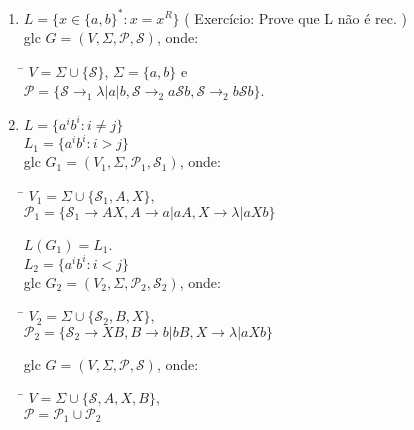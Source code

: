 \documentclass{article}
\begin{document}
\begin{enumerate}
    \item $ L = \{ x \in \{a,b\}^* : x = x^R \} $ ( Exercício: Prove que L não é rec. )\\
        glc $  G = ( V, \Sigma, \mathcal{P}, \mathcal{S} ) $, onde:
        \begin{tabbing}
            \hspace{0.5cm}\= $ V = \Sigma \cup \{\mathcal{S}\} $, $ \Sigma = \{a,b\} $ e\\
                        \> $ \mathcal{P} = \{   \mathcal{S} \rightarrow_1 \lambda | a | b, 
                                                \mathcal{S} \rightarrow_2 a\mathcal{S}b,
                                                \mathcal{S} \rightarrow_2 b\mathcal{S}b \} $.\\
        \end{tabbing}
    \item $ L = \{a^ib^i : i \neq j \} $\\
            $ L_1 = \{a^ib^i : i > j \} $\\
            glc $ G_1 = ( V_1, \Sigma, \mathcal{P}_1, \mathcal{S}_1 ) $, onde:
            \begin{tabbing}
                \hspace{0.5cm}\= $ V_1 = \Sigma \cup \{\mathcal{S}_1,A,X\}, $\\
                            \> $ \mathcal{P}_1 = \{ \mathcal{S}_1 \rightarrow AX,
                                                    A \rightarrow a | aA,
                                                    X \rightarrow \lambda | aXb \} $ \\ 
            \end{tabbing}
            $ L(G_1) = L_1 $.\\[5pt]
            $ L_2 = \{a^ib^i : i < j \} $\\
            glc $ G_2 = ( V_2, \Sigma, \mathcal{P}_2, \mathcal{S}_2 ) $, onde:
            \begin{tabbing}
                \hspace{0.5cm}\= $ V_2 = \Sigma \cup \{\mathcal{S}_2,B,X\}, $\\
                            \> $ \mathcal{P}_2 = \{ \mathcal{S}_2 \rightarrow XB,
                                                    B \rightarrow b | bB,
                                                    X \rightarrow \lambda | aXb \} $ \\ 
            \end{tabbing}
            glc $ G = ( V, \Sigma, \mathcal{P}, \mathcal{S} ) $, onde:
            \begin{tabbing}
                \hspace{0.5cm}\= $ V = \Sigma \cup \{\mathcal{S},A,X,B\}, $\\
                            \> $ \mathcal{P} = \mathcal{P}_1 \cup \mathcal{P}_2$ \\ 
            \end{tabbing}

\end{enumerate}
\end{document}
